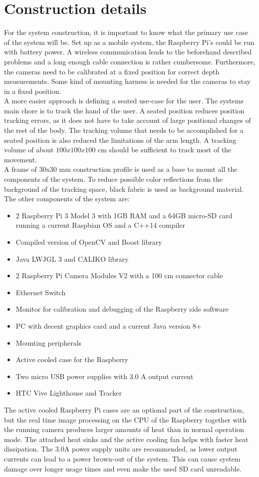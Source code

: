 \section{Construction details}
For the system construction, it is important to know what the primary use case of the system will be. Set up as a mobile system, the Raspberry Pi's could be run with battery power. A wireless communication leads to the beforehand described problems and a long enough cable connection is rather cumbersome. Furthermore, the cameras need to be calibrated at a fixed position for correct depth measurements. Some kind of mounting harness is needed for the cameras to stay in a fixed position.\\
A more easier approach is defining a seated use-case for the user. The systems main chore is to track the hand of the user. A seated position reduces position tracking errors, as it does not have to take account of large positional changes of the rest of the body.
The tracking volume that needs to be accomplished for a seated position is also reduced the limitations of the arm length. A tracking volume of about $100x100x100$ cm should be sufficient to track most of the movement.\\
A frame of 30x30 mm construction profile is used as a base to mount all the components of the system. To reduce possible color reflections from the background of the tracking space, black fabric is used as background material. The other components of the system are:
\begin{itemize}
\item 2 Raspberry Pi 3 Model 3 with 1GB RAM and a 64GB micro-SD card running a current Raspbian OS and a C++14 compiler
\item Compiled version of OpenCV and Boost library
\item Java LWJGL 3 and CALIKO library
\item 2 Raspberry Pi Camera Modules V2 with a 100 cm connector cable
\item Ethernet Switch
\item Monitor for calibration and debugging of the Raspberry side software
\item PC with decent graphics card and a current Java version 8+
\item Mounting peripherals
\item Active cooled case for the Raspberry
\item Two micro USB power supplies with 3.0 A output current
\item HTC Vive Lighthouse and Tracker
\end{itemize}
The active cooled Raspberry Pi cases are an optional part of the construction, but the real time image processing on the CPU of the Raspberry together with the running camera produces larger amounts of heat than in normal operation mode. The attached heat sinks and the active cooling fan helps with faster heat dissipation. The 3.0A power supply units are recommended, as lower output currents can lead to a power brown-out of the system. This can cause system damage over longer usage times and even make the used SD card unreadable.
